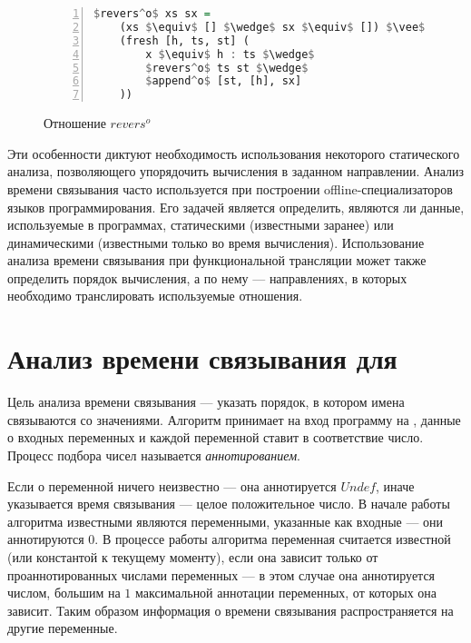 \documentclass[conference,american,russian]{IEEEtran}
\begin{document}
\begin{figure}[h!]
  \begin{center}
  \begin{minipage}{0.35\textwidth}
  \begin{lstlisting}[language=Haskell, frame=single, numbers=left,numberstyle=\small, escapechar=|]
  $revers^o$ xs sx =
    (xs $\equiv$ [] $\wedge$ sx $\equiv$ []) $\vee$
    (fresh [h, ts, st] (
        x $\equiv$ h : ts $\wedge$
        $revers^o$ ts st $\wedge$
        $append^o$ [st, [h], sx]  
    ))
    \end{lstlisting}
  \end{minipage}
  \end{center}
  \caption{Отношение $revers^o$}
  \label{lst:reversoDEF}
\end{figure}

Эти особенности диктуют необходимость использования некоторого статического анализа, позволяющего упорядочить вычисления в заданном направлении. 
Анализ времени связывания часто используется при построении offline-специализаторов языков программирования. 
Его задачей является определить, являются ли данные, используемые в программах, статическими (известными заранее) или динамическими (известными только во время вычисления).
Использование анализа времени связывания при функциональной трансляции может также определить порядок вычисления, а по нему --- направлениях, в которых необходимо транслировать используемые отношения. 

\section{Анализ времени связывания для \miniKanren{}}\label{bta}

Цель анализа времени связывания --- указать порядок, в котором имена связываются со значениями.
Алгоритм принимает на вход программу на \miniKanren{}, данные о входных переменных и каждой переменной ставит в соответствие число.
Процесс подбора чисел называется \emph{аннотированием}.

Если о переменной ничего неизвестно --- она аннотируется $Undef$, иначе указывается время связывания --- целое положительное число.
В начале работы алгоритма известными являются переменными, указанные как входные --- они аннотируются $0$.
В процессе работы алгоритма переменная считается известной (или константой к текущему моменту), если она зависит только от проаннотированных числами переменных --- в этом случае она аннотируется числом, большим на $1$ максимальной аннотации переменных, от которых она зависит.
Таким образом информация о времени связывания распространяется на другие переменные.
\end{document}

